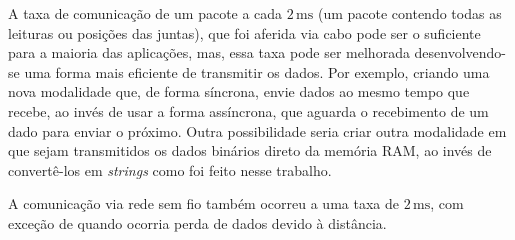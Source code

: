     A taxa de comunicação de um pacote a cada $2\,\mathrm{ms}$ (um pacote contendo todas as leituras ou posições das juntas), que foi aferida via cabo pode ser o suficiente para a maioria das aplicações, mas, essa taxa pode ser melhorada desenvolvendo-se uma forma mais eficiente de transmitir os dados. Por exemplo, criando uma nova modalidade que, de forma síncrona, envie dados ao mesmo tempo que recebe, ao invés de usar a forma assíncrona, que aguarda o recebimento de um dado para enviar o próximo. Outra possibilidade seria criar outra modalidade em que sejam transmitidos os dados binários direto da memória RAM, ao invés de convertê-los em \textit{strings} como foi feito nesse trabalho.
    
    A comunicação via rede sem fio também ocorreu a uma taxa de $2\,\mathrm{ms}$, com exceção de quando ocorria perda de dados devido à distância.
